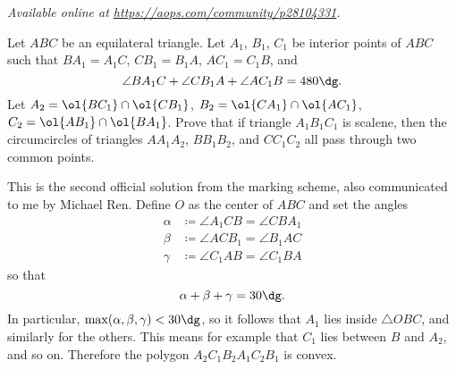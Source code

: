 
\textsl{Available online at \url{https://aops.com/community/p28104331}.}
\begin{mdframed}[style=mdpurplebox,frametitle={Problem statement}]
Let $ABC$ be an equilateral triangle.
Let $A_1$, $B_1$, $C_1$ be interior points of $ABC$
such that $BA_1=A_1C$, $CB_1=B_1A$, $AC_1=C_1B$, and
\[ \angle BA_1C + \angle CB_1A + \angle AC_1B = 480\dg. \]
Let $A_2 = \ol{BC_1} \cap \ol{CB_1}$, $B_2 = \ol{CA_1} \cap \ol{AC_1}$,
$C_2 = \ol{AB_1} \cap \ol{BA_1}$.
Prove that if triangle $A_1B_1C_1$ is scalene,
then the circumcircles of triangles $AA_1A_2$, $BB_1B_2$, and $CC_1C_2$
all pass through two common points.
\end{mdframed}
This is the second official solution from the marking scheme,
also communicated to me by Michael Ren.
Define $O$ as the center of $ABC$ and set the angles
\begin{align*}
  \alpha &\coloneqq \angle A_1CB = \angle CBA_1 \\
  \beta &\coloneqq \angle ACB_1 = \angle B_1AC \\
  \gamma &\coloneqq \angle C_1AB = \angle C_1BA
\end{align*}
so that
\[ \alpha + \beta + \gamma = 30\dg. \]
In particular, $\max(\alpha,\beta,\gamma) < 30\dg$,
so it follows that $A_1$ lies inside $\triangle OBC$, and similarly for the others.
This means for example that $C_1$ lies between $B$ and $A_2$, and so on.
Therefore the polygon $A_2C_1B_2A_1C_2B_1$ is convex.


